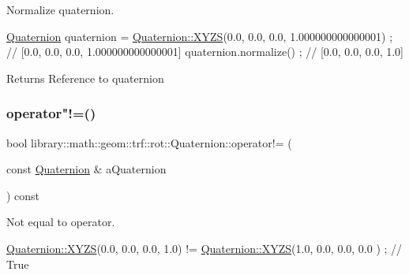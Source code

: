 Normalize quaternion. 


\begin{DoxyCode}
\hyperlink{classlibrary_1_1math_1_1geom_1_1trf_1_1rot_1_1_quaternion_aa7f459a08f5af38b9f7676a6bf36a21c}{Quaternion} quaternion = \hyperlink{classlibrary_1_1math_1_1geom_1_1trf_1_1rot_1_1_quaternion_afff9523c7dcbfbbc521736121e62ad41}{Quaternion::XYZS}(0.0, 0.0, 0.0, 1.000000000000001) ; \textcolor{comment}{//
       [0.0, 0.0, 0.0, 1.000000000000001]}
quaternion.normalize() ; \textcolor{comment}{// [0.0, 0.0, 0.0, 1.0]}
\end{DoxyCode}


\begin{DoxyReturn}{Returns}
Reference to quaternion 
\end{DoxyReturn}
\mbox{\label{classlibrary_1_1math_1_1geom_1_1trf_1_1rot_1_1_quaternion_ad32520a30642548650622e22c6686e64}} 
\subsubsection{\texorpdfstring{operator"!=()}{operator!=()}}
{\footnotesize\ttfamily bool library\+::math\+::geom\+::trf\+::rot\+::\+Quaternion\+::operator!= (\begin{DoxyParamCaption}\item[{const \hyperlink{classlibrary_1_1math_1_1geom_1_1trf_1_1rot_1_1_quaternion}{Quaternion} \&}]{a\+Quaternion }\end{DoxyParamCaption}) const}



Not equal to operator. 


\begin{DoxyCode}
\hyperlink{classlibrary_1_1math_1_1geom_1_1trf_1_1rot_1_1_quaternion_afff9523c7dcbfbbc521736121e62ad41}{Quaternion::XYZS}(0.0, 0.0, 0.0, 1.0) != \hyperlink{classlibrary_1_1math_1_1geom_1_1trf_1_1rot_1_1_quaternion_afff9523c7dcbfbbc521736121e62ad41}{Quaternion::XYZS}(1.0, 0.0, 0.0, 0.0
      ) ; \textcolor{comment}{// True}
\end{DoxyCode}



